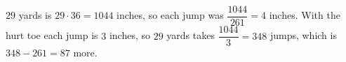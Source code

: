 $29$ yards is $29\cdot36=1044$ inches, so each jump was $\dfrac{1044}{261}=4$ inches. With the hurt toe each jump is $3$ inches, so $29$ yards takes $\dfrac{1044}{3}=348$ jumps, which is $348-261=\boxed{87}$ more.
